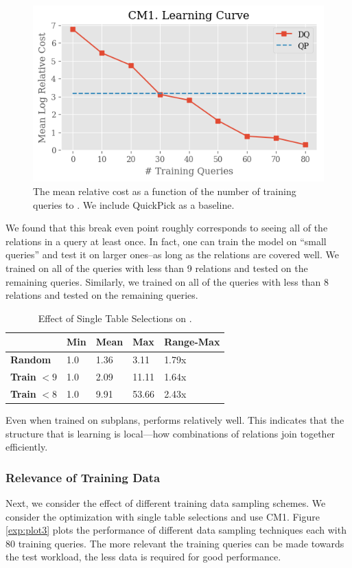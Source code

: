 \begin{figure}
    \centering
    \includegraphics[width=0.8\columnwidth]{exp/exp2_plot1.png}
    \caption{\small{The mean relative cost as a function of the number of training queries to \sys. We include QuickPick as a baseline.} \label{exp:plot2}}
\end{figure}

We found that this break even point roughly corresponds to seeing all of the relations in a query at least once. In fact, one can train the model on ``small queries'' and test it on larger ones--as long as the relations are covered well. We trained \sys on all of the queries with less than 9 relations and tested on the remaining queries. Similarly, we trained on all of the queries with less than 8 relations and tested on the remaining queries. 

\begin{table}[ht!]\centering \small
\caption{\small{Effect of Single Table Selections on \sys.}}\vspace{0.25em}
\begin{tabular}{|l|l|l|l|l|}\hline
    & {\bf Min}  & {\bf Mean}  & {\bf Max}    & {\bf Range-Max} \\ \hline
{\bf Random}  & 1.0  & 1.36   & 3.11    & 1.79x\\ \hline
{\bf Train} $< 9$  & 1.0  & 2.09   & 11.11    & 1.64x\\ \hline
{\bf Train} $< 8$  & 1.0  & 9.91   & 53.66    & 2.43x\\ \hline
\end{tabular}
\end{table}

Even when trained on subplans, \sys performs relatively well. This indicates that the structure that \sys is learning is local---how combinations of relations join together efficiently.

\subsubsection{Relevance of Training Data}
Next, we consider the effect of different training data sampling schemes. 
We consider the optimization with single table selections and use CM1.
Figure \ref{exp:plot3} plots the performance of different data sampling techniques each with 80 training queries. The more relevant the training queries can be made towards the test workload, the less data is required for good performance.

